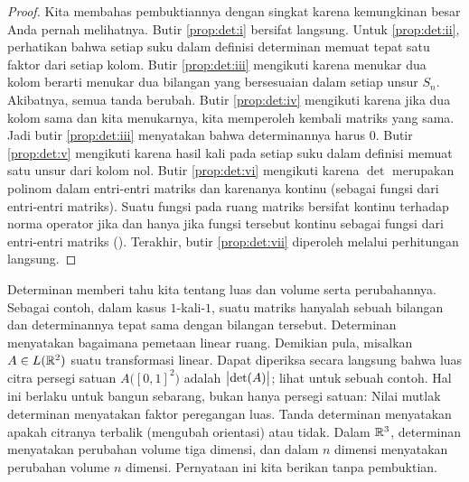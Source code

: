 \begin{proof}
Kita membahas pembuktiannya dengan singkat karena kemungkinan besar Anda pernah melihatnya.
%
Butir \ref{prop:det:i} bersifat langsung.  Untuk \ref{prop:det:ii}, perhatikan bahwa setiap suku dalam definisi
determinan memuat tepat satu faktor dari setiap kolom.
%
Butir \ref{prop:det:iii} mengikuti karena menukar dua kolom berarti menukar
dua bilangan yang bersesuaian dalam setiap unsur $S_n$.  Akibatnya, semua tanda
berubah.
Butir \ref{prop:det:iv} mengikuti karena jika dua kolom sama dan kita
menukarnya, kita memperoleh kembali
matriks yang sama.  Jadi butir \ref{prop:det:iii} menyatakan bahwa determinannya harus 0.
%
Butir \ref{prop:det:v} mengikuti karena hasil kali pada setiap suku dalam definisi memuat
satu unsur dari kolom nol.
Butir \ref{prop:det:vi} mengikuti karena $\det$ merupakan polinom dalam entri-entri matriks
dan karenanya kontinu (sebagai fungsi dari entri-entri matriks).
Suatu fungsi pada ruang matriks bersifat kontinu terhadap norma operator jika dan hanya jika
fungsi tersebut kontinu sebagai fungsi dari entri-entri matriks
().
Terakhir, butir \ref{prop:det:vii} diperoleh melalui perhitungan langsung.
\end{proof}

Determinan memberi tahu kita tentang luas dan volume serta perubahannya.
Sebagai contoh, dalam kasus $1$-kali-$1$, suatu matriks hanyalah sebuah bilangan dan
determinannya tepat sama dengan bilangan tersebut.  Determinan menyatakan bagaimana pemetaan linear
 ruang.  Demikian pula,
misalkan $A \in L({\mathbb{R}}^2)$ suatu transformasi linear.
Dapat diperiksa secara langsung bahwa
luas citra persegi satuan $A\bigl([0,1]^2\bigr)$ adalah
$\bigl\lvert {\det(A)} \bigr\rvert$; lihat  untuk sebuah contoh.
Hal ini berlaku untuk bangun sebarang, bukan hanya persegi
satuan:
Nilai mutlak determinan menyatakan faktor peregangan luas.
Tanda determinan menyatakan apakah citranya
terbalik (mengubah orientasi) atau tidak.
Dalam ${\mathbb{R}}^3$, determinan
menyatakan perubahan volume tiga dimensi, dan dalam $n$ dimensi menyatakan perubahan
volume $n$ dimensi.  Pernyataan ini kita berikan tanpa pembuktian.
\begin{myfigureht}
\caption{Citra persegi satuan ${[0,1]}^2$ melalui matriks
$\left[\begin{smallmatrix}1 & 1 \\ -1 & 1\end{smallmatrix}\right]$.
Citranya merupakan persegi dengan panjang sisi $\sqrt{2}$, sehingga luasnya 2, dan determinan
matriks tersebut adalah 2.\label{fig:imagesquare}}
\end{myfigureht}

